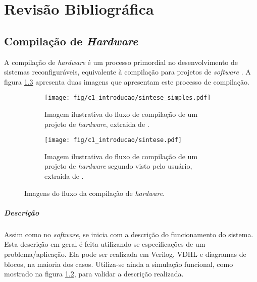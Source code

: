 \documentclass[11pt,a4paper,oneside]{book}
\begin{document}
	\frontmatter
	\tableofcontents
	\mainmatter
	
	\newcommand\qt[1]{\lq\lq{}#1\rq\rq{}}
	\newcommand\qti[1]{\lq\lq{}\textit{#1}\rq\rq{}}
\fi
                      
\chapter{Revis\~{a}o Bibliogr\'{a}fica}\label{CapRevisaoBibliografica}


\section{Compilação de \textit{Hardware}}
A compilação de \textit{hardware} é um processo primordial no desenvolvimento de sistemas reconfiguráveis, equivalente à compilação para projetos de \textit{software} \cite{Hauck2007}.
A figura \ref{fig:sintese} apresenta duas imagens que apresentam este processo de compilação.

\begin{figure}[h]
	\centering
       	\begin{subfigure}[b]{0.4\textwidth}
       		\centering
		\texttt{[image: fig/c1\_introducao/sintese\_simples.pdf]}
		\caption{Imagem ilustrativa do fluxo de compilação de um projeto de \textit{hardware}, extraida de \cite{Hauck2007}.}
		\label{fig:sintese_simples}
	\end{subfigure}\quad
	\begin{subfigure}[b]{0.55\textwidth}
		\centering
		\texttt{[image: fig/c1\_introducao/sintese.pdf]}
		\caption{Imagem ilustrativa do fluxo de compilação de um projeto de \textit{hardware} segundo visto pelo usuário, extraida de \cite{Hauck2007}.}
		\label{fig:sintese_user}
	\end{subfigure}
	\caption{Imagens do fluxo da compilação de \textit{hardware}.}
	\label{fig:sintese}
\end{figure}

\paragraph{Descrição}
Assim como no \textit{software},  se inicia com a descrição do funcionamento do sistema.
Esta descrição em geral é feita utilizando-se especificações de um problema/aplicação.
Ela pode ser realizada em Verilog, VDHL e diagramas de blocos, na maioria dos casos.
Utiliza-se ainda a simulação funcional, como mostrado na figura \ref{fig:sintese_user}, para validar a descrição realizada.
\end{document}
